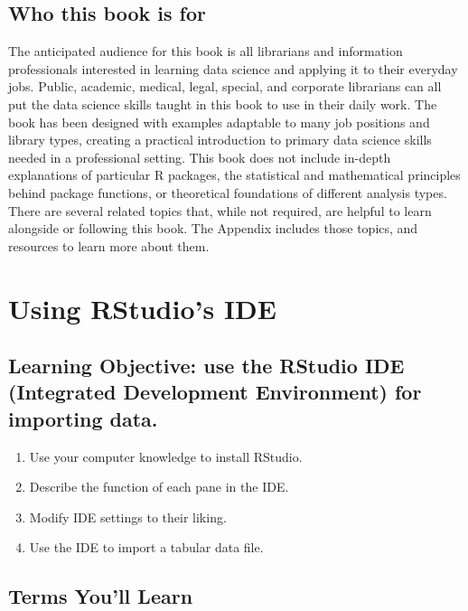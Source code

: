 \documentclass[
  krantz2]{krantz}
\providecommand{\tightlist}{%
  \setlength{\itemsep}{0pt}\setlength{\parskip}{0pt}}
\begin{document}
\hypertarget{audience}{%
\section{Who this book is for}\label{audience}}

The anticipated audience for this book is all librarians and information professionals interested in learning data science and applying it to their everyday jobs. Public, academic, medical, legal, special, and corporate librarians can all put the data science skills taught in this book to use in their daily work. The book has been designed with examples adaptable to many job positions and library types, creating a practical introduction to primary data science skills needed in a professional setting. This book does not include in-depth explanations of particular R packages, the statistical and mathematical principles behind package functions, or theoretical foundations of different analysis types. There are several related topics that, while not required, are helpful to learn alongside or following this book. The Appendix includes those topics, and resources to learn more about them.

\hypertarget{rstudio}{%
\chapter{Using RStudio's IDE}\label{rstudio}}

\hypertarget{rstudio-los}{%
\section{Learning Objective: use the RStudio IDE (Integrated Development Environment) for importing data.}\label{rstudio-los}}

\begin{enumerate}
\def\labelenumi{\arabic{enumi}.}
\tightlist
\item
  Use your computer knowledge to install RStudio.
\item
  Describe the function of each pane in the IDE.
\item
  Modify IDE settings to their liking.
\item
  Use the IDE to import a tabular data file.
\end{enumerate}

\hypertarget{rstudio-terms}{%
\section{Terms You'll Learn}\label{rstudio-terms}}
\end{document}
